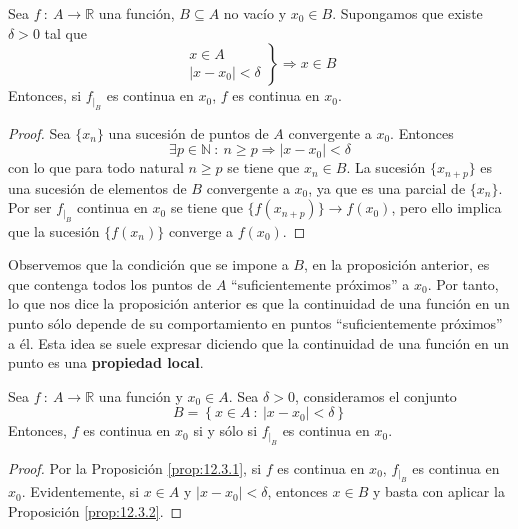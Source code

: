 \begin{prop}\label{prop:12.3.2}
    Sea $f ~:~ A \longrightarrow \mathbb{R}$ una función, $B \subseteq A$ no vacío y $x_0 \in B$. Supongamos que existe $\delta > 0$ tal que
    \begin{equation*}
        \left. \begin{array}{r}
            x \in A \\
            \left|x - x_0\right| < \delta
        \end{array}
        \right\}
        \Longrightarrow x \in B
    \end{equation*}
    Entonces, si $f_{|_B}$ es continua en $x_0$, $f$ es continua en $x_0$.
\end{prop}
\begin{proof}
    Sea $\{x_n\}$ una sucesión de puntos de $A$ convergente a $x_0$. Entonces
    \begin{equation*}
        \exists p \in \mathbb{N} ~:~ n \geq p \Longrightarrow \left|x - x_0\right| < \delta
    \end{equation*}
    con lo que para todo natural $n \geq p$ se tiene que $x_n \in B$. La sucesión $\{x_{n+p}\}$ es una sucesión de elementos de $B$ convergente a $x_0$, ya que es una parcial de $\{x_n\}$. Por ser $f_{|_B}$ continua en $x_0$ se tiene que $\{f(x_{n+p})\} \longrightarrow f(x_0)$, pero ello implica que la sucesión $\{f(x_n)\}$ converge a $f(x_0)$.
\end{proof}

Observemos que la condición que se impone a $B$, en la proposición anterior, es que contenga todos los puntos de $A$ ``suficientemente próximos'' a $x_0$.
Por tanto, lo que nos dice la proposición anterior es que la continuidad de una función en un punto sólo depende de su comportamiento en puntos ``suficientemente próximos'' a él.
Esta idea se suele expresar diciendo que la continuidad de una función en un punto es una \textbf{propiedad local}.

\begin{coro}\label{coro:12.3.3}
    Sea $f ~:~ A \longrightarrow \mathbb{R}$ una función y $x_0 \in A$. Sea $\delta > 0$, consideramos el conjunto
    \begin{equation*}
        B = \left\{x \in A ~:~ \left|x-x_0\right| < \delta \right\}
    \end{equation*}
    Entonces, $f$ es continua en $x_0$ si y sólo si $f_{|_B}$ es continua en $x_0$.
\end{coro}
\begin{proof}
    Por la Proposición \ref{prop:12.3.1}, si $f$ es continua en $x_0$, $f_{|_B}$ es continua en $x_0$.
    Evidentemente, si $x \in A$ y $\left|x-x_0\right| < \delta$, entonces $x \in B$ y basta con aplicar la Proposición \ref{prop:12.3.2}.
\end{proof}

